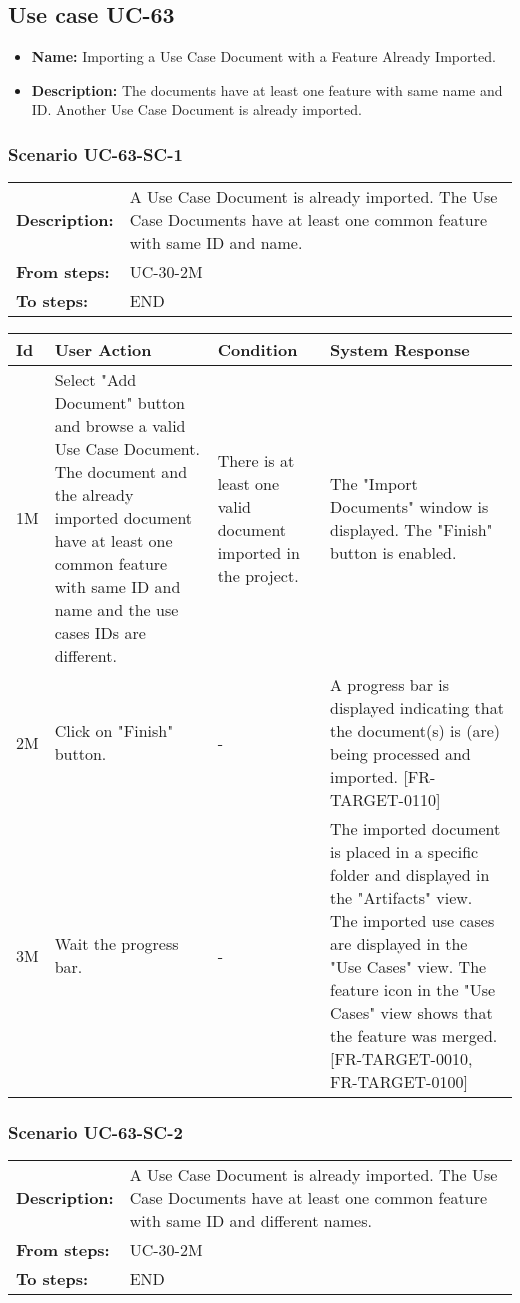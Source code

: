 \documentclass[a4paper,11pt]{article}
\newcommand{\bl}{\\ \hline}
\begin{document}
\subsection*{Use case UC-63}
\begin{itemize}
\item {\bf Name: }Importing a Use Case Document with a Feature Already Imported.
\item {\bf Description: }The documents have at least one feature with same name and ID. Another Use Case Document is already imported.
\end{itemize}
\subsubsection*{Scenario UC-63-SC-1}
\begin{tabular}{p{1in}p{4in}}
{\bf Description:} & A Use Case Document is already imported. The Use Case Documents have at least one common feature with same ID and name. \\
{\bf From steps:} & UC-30-2M \\
{\bf To steps:} & END \\
\end{tabular}
 
\begin{tabular}{|p{0.8in}|p{1.6in}|p{1.6in}|p{1.6in}|}
\hline
Id & User Action & Condition & System Response  \bl 
1M & Select "Add Document" button and browse a valid Use Case Document. The document and the already imported document have at least one common feature with same ID and name and the use cases IDs are different. & There is at least one valid document imported in the project. & The "Import Documents" window is displayed. The "Finish" button is enabled. \bl 
2M & Click on "Finish" button. & - & A progress bar is displayed indicating that the document(s) is (are) being processed and imported. [FR-TARGET-0110] \bl 
3M & Wait the progress bar. & - & The imported document is placed in a specific folder and displayed in the "Artifacts" view. The imported use cases are displayed in the "Use Cases" view. The feature icon in the "Use Cases" view shows that the feature was merged. [FR-TARGET-0010, FR-TARGET-0100] \bl 
\end{tabular}
\subsubsection*{Scenario UC-63-SC-2}
\begin{tabular}{p{1in}p{4in}}
{\bf Description:} & A Use Case Document is already imported. The Use Case Documents have at least one common feature with same ID and different names. \\
{\bf From steps:} & UC-30-2M \\
{\bf To steps:} & END \\
\end{tabular}
 
\end{document}
